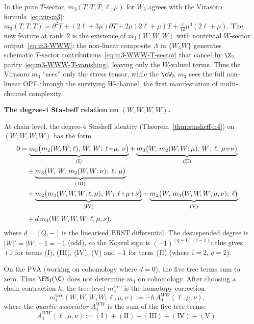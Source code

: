 \begin{remark}
\label{rem:m3-comparison}
In the pure $T$-sector, $m_3(T,T,T;\ell,\mu)$ for $W_3$ agrees
with the Virasoro formula~\eqref{eq:vir-m3}:
$m_3(T,T,T) = \partial^2 T + (2\ell + 3\mu)\partial T
+ 2\mu(2\ell + \mu)T + \frac{c}{12}\mu^3(2\ell + \mu)$.
The new feature at rank~$2$ is the existence of $m_3(W,W,W)$
with nontrivial $W$-sector output~\eqref{eq:m3-WWW}:
the non-linear composite $\Lambda$ in $\{W_\lambda W\}$
generates schematic $T$-sector contributions~\eqref{eq:m3-WWW-T-sector}
that cancel by $\Z_2$ parity~\eqref{eq:m3-WWW-T-vanishing},
leaving only the $W$-valued terms. Thus the Virasoro
$m_3$ ``sees'' only the stress tensor, while the $\cW_3$
$m_3$ sees the full non-linear OPE through the surviving
$W$-channel, the first manifestation of multi-channel
complexity.
\end{remark}

\medskip
\noindent\textbf{The degree-\(4\) Stasheff relation on \((W,W,W,W)\).}

At chain level, the degree-\(4\) Stasheff identity
(Theorem~\ref{thm:stasheff-n4}) on \((W,W,W,W)\) has the form
\begin{align}
\label{eq:stasheff-4-WWWW}
0 &= \underbrace{m_3\bigl(m_2(W,W;\ell),\, W,\, W;\;
 \ell{+}\mu,\, \nu\bigr)}_{\mathrm{(I)}}
+ \underbrace{m_3\bigl(W,\, m_2(W,W;\mu),\, W;\;
 \ell,\, \mu{+}\nu\bigr)}_{\mathrm{(II)}} \notag\\
&\quad + \underbrace{m_3\bigl(W,\, W,\, m_2(W,W;\nu);\;
 \ell,\, \mu\bigr)}_{\mathrm{(III)}} \notag\\
&\quad + \underbrace{m_2\bigl(m_3(W,W,W;\ell,\mu),\, W;\;
 \ell{+}\mu{+}\nu\bigr)}_{\mathrm{(IV)}}
+ \underbrace{m_2\bigl(W,\, m_3(W,W,W;\mu,\nu);\;
 \ell\bigr)}_{\mathrm{(V)}} \notag\\[4pt]
&\quad + d\,m_4(W,W,W,W;\ell,\mu,\nu),
\end{align}
where $d = [Q,-]$ is the linearised BRST differential.
The desuspended degree is $|W|' = |W| - 1 = -1$ (odd), so
the Koszul sign is $(-1)^{(q-1)(i-1)}$: this gives $+1$ for
terms (I), (III), (IV), (V) and $-1$ for term~(II)
(where $i = 2$, $q = 2$).

On the PVA (working on cohomology where \(d=0\)), the five tree terms
sum to zero. Thus \(\FM_4(\C)\) does not determine \(m_4\) on
cohomology. After choosing a chain contraction \(h\), the tree-level
\(m_4^{\mathrm{tree}}\) is the homotopy correction
\begin{equation}
\label{eq:m4-tree-definition}
m_4^{\mathrm{tree}}(W,W,W,W;\ell,\mu,\nu)
:= -h\,A_4^{WW}(\ell,\mu,\nu),
\end{equation}
where the \emph{quartic associator} $A_4^{WW}$ is the sum of
the five tree terms:
\begin{equation}
\label{eq:A4-definition}
A_4^{WW}(\ell,\mu,\nu)
:= \mathrm{(I)} + \mathrm{(II)} + \mathrm{(III)}
 + \mathrm{(IV)} + \mathrm{(V)}.
\end{equation}

